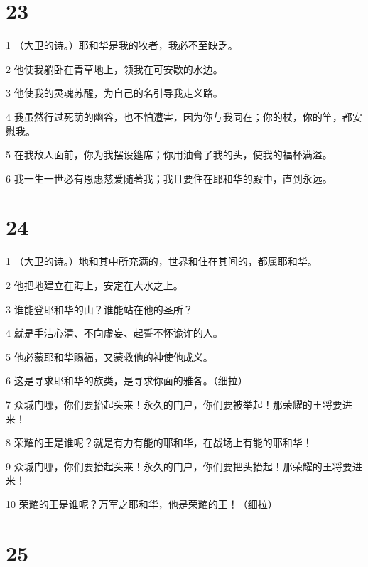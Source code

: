 \chapter{23}

\par 1 （大卫的诗。）耶和华是我的牧者，我必不至缺乏。
\par 2 他使我躺卧在青草地上，领我在可安歇的水边。
\par 3 他使我的灵魂苏醒，为自己的名引导我走义路。
\par 4 我虽然行过死荫的幽谷，也不怕遭害，因为你与我同在；你的杖，你的竿，都安慰我。
\par 5 在我敌人面前，你为我摆设筵席；你用油膏了我的头，使我的福杯满溢。
\par 6 我一生一世必有恩惠慈爱随著我；我且要住在耶和华的殿中，直到永远。

\chapter{24}

\par 1 （大卫的诗。）地和其中所充满的，世界和住在其间的，都属耶和华。
\par 2 他把地建立在海上，安定在大水之上。
\par 3 谁能登耶和华的山？谁能站在他的圣所？
\par 4 就是手洁心清、不向虚妄、起誓不怀诡诈的人。
\par 5 他必蒙耶和华赐福，又蒙救他的神使他成义。
\par 6 这是寻求耶和华的族类，是寻求你面的雅各。（细拉）
\par 7 众城门哪，你们要抬起头来！永久的门户，你们要被举起！那荣耀的王将要进来！
\par 8 荣耀的王是谁呢？就是有力有能的耶和华，在战场上有能的耶和华！
\par 9 众城门哪，你们要抬起头来！永久的门户，你们要把头抬起！那荣耀的王将要进来！
\par 10 荣耀的王是谁呢？万军之耶和华，他是荣耀的王！（细拉）

\chapter{25}

